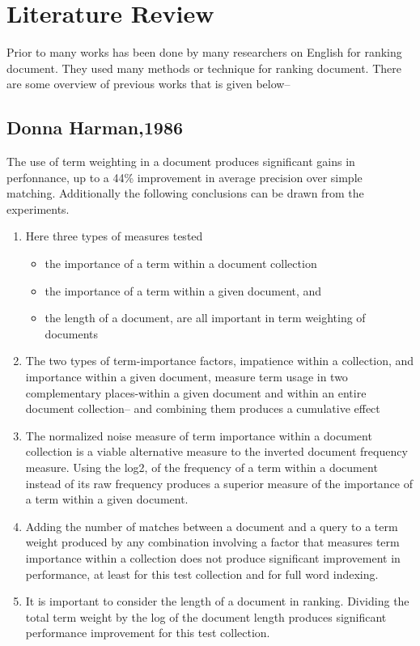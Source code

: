 \chapter{Literature Review}
\label{Ch_Chapter2}


Prior to many works has been done by many researchers on English for ranking document. They used many methods or technique for ranking document. There are some overview of previous works that is given below--

\section{Donna Harman,1986}

The use of term weighting in a document produces significant gains in perfonnance, up to a 44\% improvement in average precision over simple matching. Additionally the following conclusions can be drawn from the experiments.

\begin{enumerate}
	\item Here three types of measures tested
	\begin{itemize}
		\item the importance of a term within a document collection
		\item the importance of a term within a given document, and
		\item the length of a document, are all important in term weighting of documents
	\end{itemize}
	
	\item The two types of term-importance factors, impatience within a collection, and importance within a given document, measure term usage in two complementary places-within a given document and within an entire document collection-- and combining them produces a cumulative effect
	
	\item The normalized noise measure of term importance within a document collection is a viable alternative measure to the inverted document frequency measure. Using the log2, of the frequency of a term within a document instead of its raw frequency produces a superior measure of the importance of a term within a given document.
	
	\item Adding the number of matches between a document and a query to a term weight produced by any combination involving a factor that measures term importance within a collection does not produce significant improvement in performance, at least for this test collection and for full word indexing.
	
	\item It is important to consider the length of a document in ranking. Dividing the total term weight by the log of the document length produces significant performance improvement for this test collection.
	
\end{enumerate}


